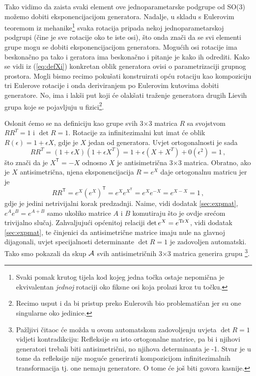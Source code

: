 Tako vidimo da zaista svaki element ove jednoparametarske podgrupe
od SO(3) možemo dobiti eksponencijacijom generatora.
Nadalje, u skladu s Eulerovim teoremom iz mehanike\footnote{Svaki pomak krutog
tijela kod kojeg jedna točka ostaje nepomična je ekvivalentan \emph{jednoj}
rotaciji oko fiksne osi koja prolazi kroz tu točku.} svaka  rotacija 
pripada nekoj jednoparametarskoj podgrupi
 (čine je sve rotacije oko te iste osi), što onda znači da se
svi elementi grupe  mogu se dobiti eksponencijacijom generatora.
Mogućih osi rotacije ima beskonačno pa tako i geratora ima beskonačno
i pitanje je kako ih odrediti.
Kako se vidi iz (\ref{eq:defXi}) konkretan oblik generatora ovisi
o parametrizaciji grupnog prostora. 
Mogli bismo recimo pokušati konstruirati opću rotaciju kao kompoziciju tri
 Eulerove rotacije i onda deriviranjem po Eulerovim kutovima dobiti
 generatore. No, ima i lakši put koji će olakšati traženje 
 generatora drugih Lievih grupa koje se pojavljuju u fizici\footnote{Recimo
     usput i da bi pristup preko Eulerovih
     bio  problematičan jer su one singularne oko jedinice.}.

Oslonit ćemo se na definiciju  kao grupe svih 
3$\times$3 matrica $R$ sa svojstvom  $RR^{T}=1$ i $\det R=1$.
Rotacije za infinitezimalni kut imat će oblik  $R(\epsilon)=1+\epsilon X$,
gdje je $X$ jedan od generatora. Uvjet ortogonalnosti je sada
\begin{equation}
 RR^{T}=(1+\epsilon X)(1+\epsilon 
   X^{T}) = 1+\epsilon (X+X^{T})+0(\epsilon^2) = 1 \,,
\end{equation}
što znači da je $X^\mathsf{T}=-X$ odnosno $X$ je antisimetrična 3$\times$3 matrica.
Obratno, ako je $X$ antisimetrična, njena eksponencijacija $R = e^X$ daje ortogonalnu
matricu jer je
\begin{equation}
  R R^\mathsf{T} = e^X (e^X)^\mathsf{T} = e^X e^{X^\mathsf{T}}
  = e^X e^{-X}
  = e^{X-X} = 1 \,,
\end{equation}
gdje je jedini netrivijalni korak predzadnji. Naime, vidi dodatak \ref{sec:expmat},
$e^{A} e^{B} = e^{A+B}$ samo ukoliko matrice $A$ i $B$ komutiraju što je ovdje
srećom trivijalno slučaj.
Zahvaljujući općenitoj relaciji $\det e^{X} = e^{\textrm{\scriptsize Tr} X}$,
vidi dodatak \ref{sec:expmat}, te činjenici da antisimetrične matrice imaju
nule na glavnoj dijagonali, uvjet specijalnosti determinante $\det R = 1$ je
zadovoljen automatski.
Tako smo pokazali da skup $\mathcal{A}$ svih antisimetričnih 3$\times$3 matrica
generira grupu \footnote{Pažljivi čitaoc će možda u ovom automatskom
    zadovoljenju uvjeta $\det R =1$ vidjeti kontradikciju:
 Refleksije su isto ortogonalne matrice,
pa bi i njihovi generatori trebali biti antisimetrični, no njihova determinanta
je -1. Stvar je u tome da refleksije nije moguće generirati kompozicijom
infinitezimalnih transformacija tj. one nemaju generatore. O tome će još biti
govora kasnije.
}.

